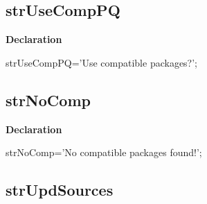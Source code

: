 \documentclass{report}
\newif\ifpdf
\begin{document}
\subsection*{strUseCompPQ}
\fi
\label{trstrings-strUseCompPQ}
\begin{list}{}{
\setlength{\itemindent}{0cm}
\setlength{\listparindent}{0cm}
\setlength{\leftmargin}{\evensidemargin}
\addtolength{\leftmargin}{\tmplength}
\settowidth{\labelsep}{X}
\addtolength{\leftmargin}{\labelsep}
\setlength{\labelwidth}{\tmplength}
}
\item[\textbf{Declaration}\hfill]
\ifpdf
\begin{flushleft}
\fi
\begin{ttfamily}
strUseCompPQ='Use compatible packages?';\end{ttfamily}

\ifpdf
\end{flushleft}
\fi

\end{list}
\ifpdf
\subsection*{\large{\textbf{strNoComp}}\normalsize\hspace{1ex}\hrulefill}
\else
\subsection*{strNoComp}
\fi
\label{trstrings-strNoComp}
\begin{list}{}{
\setlength{\itemindent}{0cm}
\setlength{\listparindent}{0cm}
\setlength{\leftmargin}{\evensidemargin}
\addtolength{\leftmargin}{\tmplength}
\settowidth{\labelsep}{X}
\addtolength{\leftmargin}{\labelsep}
\setlength{\labelwidth}{\tmplength}
}
\item[\textbf{Declaration}\hfill]
\ifpdf
\begin{flushleft}
\fi
\begin{ttfamily}
strNoComp='No compatible packages found!';\end{ttfamily}

\ifpdf
\end{flushleft}
\fi

\end{list}
\ifpdf
\subsection*{\large{\textbf{strUpdSources}}\normalsize\hspace{1ex}\hrulefill}
\else
\end{document}
